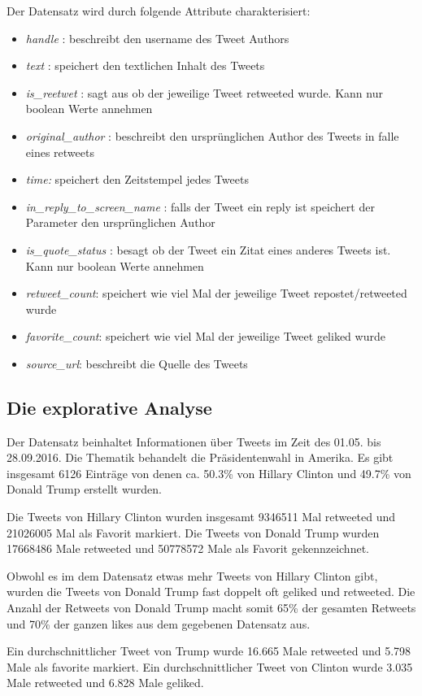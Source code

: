 \documentclass[12pt]{article}
\begin{document}
Der Datensatz wird durch folgende Attribute charakterisiert:
\begin{itemize}
\item \textit{handle} : beschreibt den username des Tweet Authors
\item\textit{text} : speichert den textlichen Inhalt des Tweets
\item\textit{is\_reetwet} : sagt aus ob der jeweilige Tweet retweeted wurde. Kann nur boolean Werte annehmen
\item\textit{original\_author} : beschreibt den ursprünglichen Author des Tweets in falle eines retweets
\item\textit{time:} speichert den Zeitstempel jedes Tweets
\item\textit{in\_reply\_to\_screen\_name} : falls der Tweet ein reply ist speichert der Parameter den ursprünglichen Author
\item\textit{is\_quote\_status} : besagt ob der Tweet ein Zitat eines anderes Tweets ist. Kann nur boolean Werte annehmen
\item\textit{retweet\_count}: speichert wie viel Mal der jeweilige Tweet repostet/retweeted wurde
\item\textit{favorite\_count}: speichert wie viel Mal der jeweilige Tweet geliked wurde
\item\textit{source\_url}: beschreibt die Quelle des Tweets
\end{itemize}

\subsection*{Die explorative Analyse}
Der Datensatz beinhaltet Informationen über Tweets im Zeit des 01.05. bis 28.09.2016. Die Thematik behandelt die Präsidentenwahl in Amerika. Es gibt insgesamt 6126 Einträge von denen ca. 50.3\% von Hillary Clinton und 49.7\% von Donald Trump erstellt wurden.

 Die Tweets von Hillary Clinton wurden insgesamt 9346511 Mal retweeted und 21026005 Mal als Favorit markiert. Die Tweets von Donald Trump wurden 17668486 Male retweeted und 50778572 Male als Favorit gekennzeichnet. 
 
Obwohl es im dem Datensatz etwas mehr Tweets von Hillary Clinton gibt, wurden die Tweets von Donald Trump fast doppelt oft geliked und retweeted.  
Die Anzahl der Retweets von Donald Trump macht somit 65\% der gesamten Retweets und 70\% der ganzen likes aus dem gegebenen Datensatz aus.

 Ein durchschnittlicher Tweet von Trump wurde 16.665 Male retweeted und 5.798 Male als favorite markiert. 
Ein durchschnittlicher Tweet von Clinton wurde 3.035 Male retweeted und 6.828 Male geliked.
\end{document}

